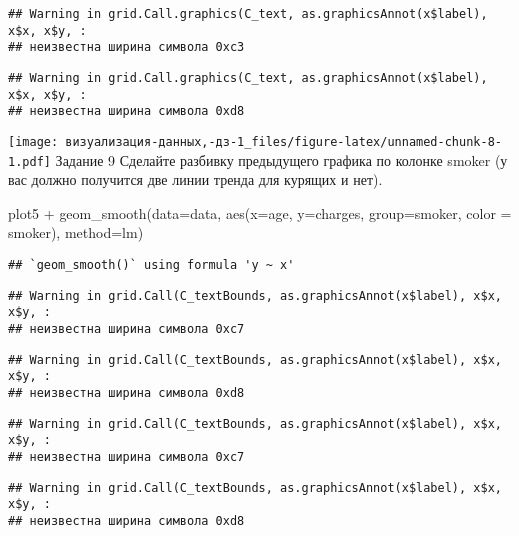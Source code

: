 \documentclass[
]{article}
\newenvironment{Shaded}{\begin{snugshade}}{\end{snugshade}}
\newcommand{\AttributeTok}[1]{\textcolor[rgb]{0.77,0.63,0.00}{#1}}
\newcommand{\FunctionTok}[1]{\textcolor[rgb]{0.00,0.00,0.00}{#1}}
\newcommand{\NormalTok}[1]{#1}
\newcommand{\SpecialCharTok}[1]{\textcolor[rgb]{0.00,0.00,0.00}{#1}}
\begin{document}
\begin{verbatim}
## Warning in grid.Call.graphics(C_text, as.graphicsAnnot(x$label), x$x, x$y, :
## неизвестна ширина символа 0xc3
\end{verbatim}

\begin{verbatim}
## Warning in grid.Call.graphics(C_text, as.graphicsAnnot(x$label), x$x, x$y, :
## неизвестна ширина символа 0xd8
\end{verbatim}

\texttt{[image: визуализация-данных,-дз-1\_files/figure-latex/unnamed-chunk-8-1.pdf]}
Задание 9 Сделайте разбивку предыдущего графика по колонке smoker (у вас
должно получится две линии тренда для курящих и нет).

\begin{Shaded}
\begin{Highlighting}[]
\NormalTok{plot5 }\SpecialCharTok{+} 
  \FunctionTok{geom\_smooth}\NormalTok{(}\AttributeTok{data=}\NormalTok{data, }\FunctionTok{aes}\NormalTok{(}\AttributeTok{x=}\NormalTok{age, }\AttributeTok{y=}\NormalTok{charges, }\AttributeTok{group=}\NormalTok{smoker, }\AttributeTok{color =}\NormalTok{ smoker), }\AttributeTok{method=}\NormalTok{lm)}
\end{Highlighting}
\end{Shaded}

\begin{verbatim}
## `geom_smooth()` using formula 'y ~ x'
\end{verbatim}

\begin{verbatim}
## Warning in grid.Call(C_textBounds, as.graphicsAnnot(x$label), x$x, x$y, :
## неизвестна ширина символа 0xc7
\end{verbatim}

\begin{verbatim}
## Warning in grid.Call(C_textBounds, as.graphicsAnnot(x$label), x$x, x$y, :
## неизвестна ширина символа 0xd8
\end{verbatim}

\begin{verbatim}
## Warning in grid.Call(C_textBounds, as.graphicsAnnot(x$label), x$x, x$y, :
## неизвестна ширина символа 0xc7
\end{verbatim}

\begin{verbatim}
## Warning in grid.Call(C_textBounds, as.graphicsAnnot(x$label), x$x, x$y, :
## неизвестна ширина символа 0xd8
\end{verbatim}
\end{document}
